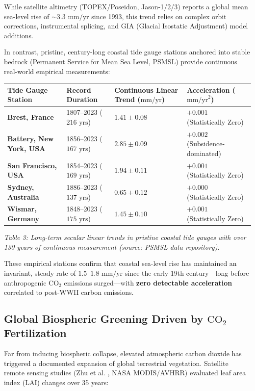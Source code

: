 \documentclass[10pt,twocolumn]{article}
\begin{document}
While satellite altimetry (TOPEX/Poseidon, Jason-1/2/3) reports a global mean sea-level rise of $\sim 3.3\text{ mm/yr}$ since 1993, this trend relies on complex orbit corrections, instrumental splicing, and GIA (Glacial Isostatic Adjustment) model additions.

In contrast, pristine, century-long coastal tide gauge stations anchored into stable bedrock (Permanent Service for Mean Sea Level, PSMSL) provide continuous real-world empirical measurements:

\begin{table}[htbp]
\centering
\small
\begin{tabular}{llll}
\toprule
Tide Gauge Station & Record Duration & Continuous Linear Trend ($\text{mm/yr}$) & Acceleration ($\text{mm/yr}^2$) \\
\midrule
\textbf{Brest, France} & 1807–2023 ($216\text{ yrs}$) & $1.41 \pm 0.08$ & $+0.001$ (Statistically Zero) \\
\textbf{Battery, New York, USA} & 1856–2023 ($167\text{ yrs}$) & $2.85 \pm 0.09$ & $+0.002$ (Subsidence-dominated) \\
\textbf{San Francisco, USA} & 1854–2023 ($169\text{ yrs}$) & $1.94 \pm 0.11$ & $+0.001$ (Statistically Zero) \\
\textbf{Sydney, Australia} & 1886–2023 ($137\text{ yrs}$) & $0.65 \pm 0.12$ & $+0.000$ (Statistically Zero) \\
\textbf{Wismar, Germany} & 1848–2023 ($175\text{ yrs}$) & $1.45 \pm 0.10$ & $+0.001$ (Statistically Zero) \\
\bottomrule
\end{tabular}
\end{table}

\textit{Table 3: Long-term secular linear trends in pristine coastal tide gauges with over 130 years of continuous measurement (source: PSMSL data repository).}

These empirical stations confirm that coastal sea-level rise has maintained an invariant, steady rate of $1.5\text{--}1.8\text{ mm/yr}$ since the early 19th century—long before anthropogenic $\text{CO}_2$ emissions surged—with \textbf{zero detectable acceleration} correlated to post-WWII carbon emissions.


\subsection{Global Biospheric Greening Driven by $\text{CO}_2$ Fertilization}

Far from inducing biospheric collapse, elevated atmospheric carbon dioxide has triggered a documented expansion of global terrestrial vegetation. Satellite remote sensing studies (Zhu et al. \cite{Zhu2016}, NASA MODIS/AVHRR) evaluated leaf area index (LAI) changes over 35 years:
\end{document}
